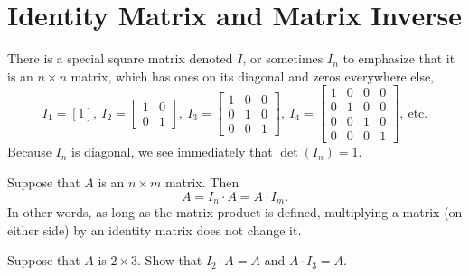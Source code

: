 \clearpage
\section{Identity Matrix and Matrix Inverse}
\label{sec:IdentityMatrixInverse}

There is a special square matrix denoted $I$, or sometimes $I_n$ to emphasize that it is an $n \times n $ matrix, which has ones on its diagonal and zeros everywhere else,
$$I_1=[1],~I_2=\begin{bmatrix} 1 & 0\\0& 1 \end{bmatrix},~I_3= \begin{bmatrix} 1 & 0 & 0\\0& 1 & 0\\ 0 & 0 & 1 \end{bmatrix}, ~I_4=\begin{bmatrix} 1 & 0 & 0 & 0\\0& 1 & 0 & 0\\ 0 & 0 & 1 & 0 \\ 0 & 0& 0& 1\end{bmatrix}, ~\text{etc.} $$ 
Because $I_n$ is diagonal, we see immediately that $\det(I_n)=1$.

\begin{tcolorbox}[title=\textbf{\large Multiplication by the Identity Matrix}]
Suppose that $A$ is an $n \times m$ matrix. Then 
$$A = I_n \cdot A = A \cdot I_m. $$
In other words, as long as the matrix product is defined, multiplying a matrix (on either side) by an identity matrix does not change it. 
\end{tcolorbox}


\begin{example}
Suppose that $A$ is $2 \times 3$. Show that $I_2 \cdot A=A$ and $A \cdot I_3=A$. 
\end{example} 

